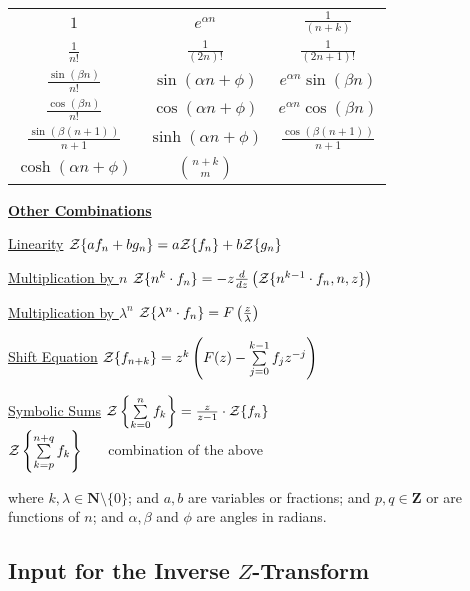 \begin{center}
  \renewcommand{\arraystretch}{2}
  \setlength{\tabcolsep}{5mm}
  \begin{tabular}{ccc}
    $1$ & $e^{\alpha n}$ & $\frac{1}{(n+k)}$ \\
    $\frac{1}{n!}$ & $\frac{1}{(2n)!}$ & $\frac{1}{(2n+1)!}$ \\
    $\frac{\sin(\beta n)}{n!}$ & $\sin(\alpha n+\phi)$ & $e^{\alpha n} \sin(\beta n)$ \\
    $\frac{\cos(\beta n)}{n!}$ & $\cos(\alpha n+\phi)$ & $e^{\alpha n} \cos(\beta n)$ \\
    $\frac{\sin(\beta (n+1))}{n+1}$ & $\sinh(\alpha n+\phi)$ & $\frac{\cos(\beta (n+1))}{n+1}$ \\
    $\cosh(\alpha n+\phi)$ & $\binom{n+k}{m}$
  \end{tabular}
\end{center}

\underline{{\bf Other Combinations}}

\begin{list}{}{
    \setlength{\leftmargin}{35mm}
    \setlength{\labelwidth}{\leftmargin}\addtolength{\labelwidth}{-\labelsep}
    \renewcommand{\makelabel}[1]{#1}
  }
\item[\underline{Linearity}]
  ${\cal Z} \{a f_n+b g_n \} = a{\cal Z} \{f_n\}+b{\cal Z}\{g_n\}$
\item[\underline{Multiplication by $n$}]
  ${\cal Z} \{n^k \cdot f_n\} = -z \frac{d}{dz} \left({\cal Z}\{n^{k-1} \cdot f_n,n,z\} \right)$
\item[\underline {Multiplication by $\lambda^n$}]
  ${\cal Z} \{\lambda^n \cdot f_n\}=F \left(\frac{z}{\lambda}\right)$
\item[\underline {Shift Equation}]
  ${\cal Z} \{f_{n+k}\} =
           z^k \left(F(z) - \sum\limits^{k-1}_{j=0} f_j z^{-j}\right)$
\item[\underline {Symbolic Sums}]
  ${\cal Z} \left\{ \sum\limits_{k=0}^{n} f_k \right\} =
  \frac{z}{z-1} \cdot {\cal Z} \{f_n\}$ \\[\baselineskip]
  ${\cal Z} \left\{ \sum\limits_{k=p}^{n+q} f_k \right\}$
  \ \ \ combination of the above
\end{list}

where $k,\lambda \in \mathbf{N} \setminus \{0\}$; and $a,b$ are variables or
fractions; and $p,q \in \mathbf{Z}$ or are functions of $n$; and
$\alpha,\beta$ and $\phi$ are angles in radians.

\subsection[Input for the Inverse Z-Transform]{Input for the Inverse $Z$-Transform}

